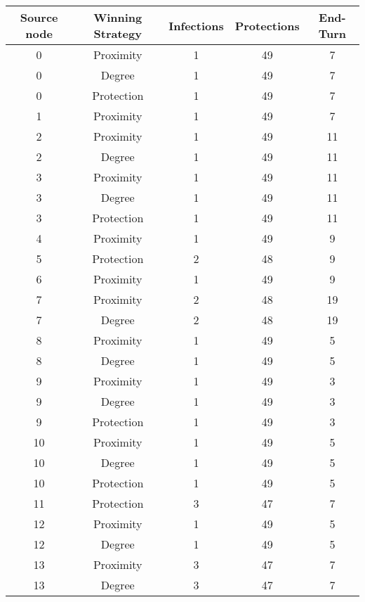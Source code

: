 \documentclass[results.tex]{subfiles}
\begin{document}
\begin{center}
  \begin{tabular}{| c || c | c | c | c |}
    \hline
    {\bfseries Source node} & {\bfseries Winning Strategy} & {\bfseries Infections} & {\bfseries Protections} & {\bfseries End-Turn} \\  %
    \hline\hline
    0 & Proximity & 1 & 49 & 7 \\ 
    \hline
    0 & Degree & 1 & 49 & 7 \\ 
    \hline
    0 & Protection & 1 & 49 & 7 \\ 
    \hline
    1 & Proximity & 1 & 49 & 7 \\ 
    \hline
    2 & Proximity & 1 & 49 & 11 \\ 
    \hline
    2 & Degree & 1 & 49 & 11 \\ 
    \hline
    3 & Proximity & 1 & 49 & 11 \\ 
    \hline
    3 & Degree & 1 & 49 & 11 \\ 
    \hline
    3 & Protection & 1 & 49 & 11 \\ 
    \hline
    4 & Proximity & 1 & 49 & 9 \\ 
    \hline
    5 & Protection & 2 & 48 & 9 \\ 
    \hline
    6 & Proximity & 1 & 49 & 9 \\ 
    \hline
    7 & Proximity & 2 & 48 & 19 \\ 
    \hline
    7 & Degree & 2 & 48 & 19 \\ 
    \hline
    8 & Proximity & 1 & 49 & 5 \\ 
    \hline
    8 & Degree & 1 & 49 & 5 \\ 
    \hline
    9 & Proximity & 1 & 49 & 3 \\ 
    \hline
    9 & Degree & 1 & 49 & 3 \\ 
    \hline
    9 & Protection & 1 & 49 & 3 \\ 
    \hline
    10 & Proximity & 1 & 49 & 5 \\ 
    \hline
    10 & Degree & 1 & 49 & 5 \\ 
    \hline
    10 & Protection & 1 & 49 & 5 \\ 
    \hline
    11 & Protection & 3 & 47 & 7 \\ 
    \hline
    12 & Proximity & 1 & 49 & 5 \\ 
    \hline
    12 & Degree & 1 & 49 & 5 \\ 
    \hline
    13 & Proximity & 3 & 47 & 7 \\ 
    \hline
    13 & Degree & 3 & 47 & 7 \\ 

\end{tabular}
\end{center}
\end{document}
